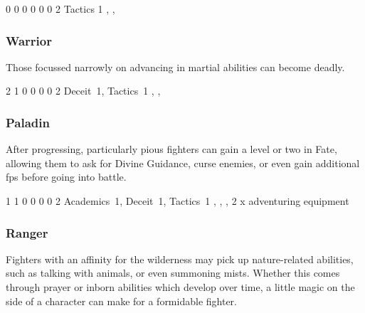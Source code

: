 {\begin{multicols}{2}

{0}%
{0}%
{{0}%
{0}%
{0}}%
{0}%
{2}%
{Tactics 1\knacks{\adrenalinesurge}}%
{\longsword, \partialleather, \bucklar}%
{\addtocounter{fp}{5}}

\subsubsection{Warrior}

Those focussed narrowly on advancing in martial abilities can become deadly.


{2}%
{1}%
{{0}%
{0}%
{0}}%
{0}%
{2}%
{Deceit~1, Tactics~1\knacks{\adrenalinesurge, \charge, \firststrike}}%
{\longsword, \partialchain, \bucklar}%
{\addtocounter{fp}{5}}

\subsubsection{Paladin}

After progressing, particularly pious fighters can gain a level or two in Fate, allowing them to ask for Divine Guidance, curse enemies, or even gain additional \glspl{fp} before going into battle.


{1}%
{1}%
{{0}%
{0}%
{0}}%
{0}%
{2}%
{Academics~1, Deceit~1, Tactics~1
\knacks{\adrenalinesurge, \charge}}%
{\greatsword, \partialchain, \bucklar, 2 x adventuring equipment}%
{\addtocounter{fp}{5}}

\subsubsection{Ranger}

Fighters with an affinity for the wilderness may pick up nature-related abilities, such as talking with animals, or even summoning mists.
Whether this comes through prayer or inborn abilities which develop over time, a little magic on the side of a character can make for a formidable fighter.


\end{multicols}}
